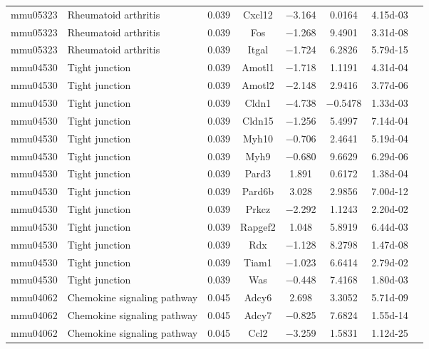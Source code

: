 {\begin{longtable}[l]{cp{4.3cm}cccccc}
mmu05323	& Rheumatoid arthritis	& \num{0.039}	& Cxcl12	& \num{-3.164}	& \num{ 0.0164}	& \num{4.15d-03}\\ 
mmu05323	& Rheumatoid arthritis	& \num{0.039}	& Fos	& \num{-1.268}	& \num{ 9.4901}	& \num{3.31d-08}\\ 
mmu05323	& Rheumatoid arthritis	& \num{0.039}	& Itgal	& \num{-1.724}	& \num{ 6.2826}	& \num{5.79d-15}\\ 
mmu04530	& Tight junction	& \num{0.039}	& Amotl1	& \num{-1.718}	& \num{ 1.1191}	& \num{4.31d-04}\\ 
mmu04530	& Tight junction	& \num{0.039}	& Amotl2	& \num{-2.148}	& \num{ 2.9416}	& \num{3.77d-06}\\ 
mmu04530	& Tight junction	& \num{0.039}	& Cldn1	& \num{-4.738}	& \num{-0.5478}	& \num{1.33d-03}\\ 
mmu04530	& Tight junction	& \num{0.039}	& Cldn15	& \num{-1.256}	& \num{ 5.4997}	& \num{7.14d-04}\\ 
mmu04530	& Tight junction	& \num{0.039}	& Myh10	& \num{-0.706}	& \num{ 2.4641}	& \num{5.19d-04}\\ 
mmu04530	& Tight junction	& \num{0.039}	& Myh9	& \num{-0.680}	& \num{ 9.6629}	& \num{6.29d-06}\\ 
mmu04530	& Tight junction	& \num{0.039}	& Pard3	& \num{ 1.891}	& \num{ 0.6172}	& \num{1.38d-04}\\ 
mmu04530	& Tight junction	& \num{0.039}	& Pard6b	& \num{ 3.028}	& \num{ 2.9856}	& \num{7.00d-12}\\ 
mmu04530	& Tight junction	& \num{0.039}	& Prkcz	& \num{-2.292}	& \num{ 1.1243}	& \num{2.20d-02}\\ 
mmu04530	& Tight junction	& \num{0.039}	& Rapgef2	& \num{ 1.048}	& \num{ 5.8919}	& \num{6.44d-03}\\ 
mmu04530	& Tight junction	& \num{0.039}	& Rdx	& \num{-1.128}	& \num{ 8.2798}	& \num{1.47d-08}\\ 
mmu04530	& Tight junction	& \num{0.039}	& Tiam1	& \num{-1.023}	& \num{ 6.6414}	& \num{2.79d-02}\\ 
mmu04530	& Tight junction	& \num{0.039}	& Was	& \num{-0.448}	& \num{ 7.4168}	& \num{1.80d-03}\\ 
mmu04062	& Chemokine signaling pathway	& \num{0.045}	& Adcy6	& \num{ 2.698}	& \num{ 3.3052}	& \num{5.71d-09}\\ 
mmu04062	& Chemokine signaling pathway	& \num{0.045}	& Adcy7	& \num{-0.825}	& \num{ 7.6824}	& \num{1.55d-14}\\ 
mmu04062	& Chemokine signaling pathway	& \num{0.045}	& Ccl2	& \num{-3.259}	& \num{ 1.5831}	& \num{1.12d-25}\\ 

\end{longtable}}
